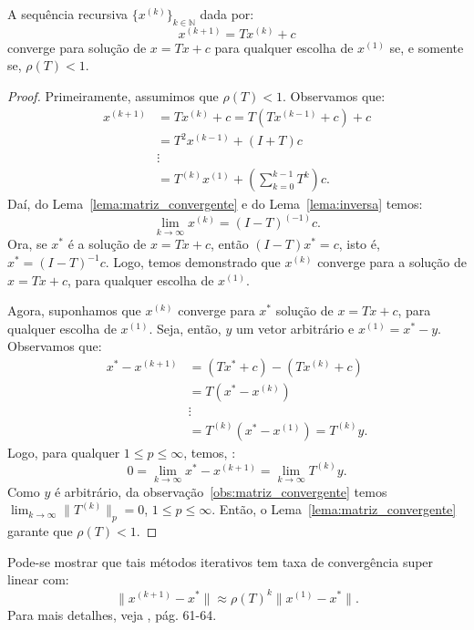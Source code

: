\begin{teo}\label{teo:convergencia}
  A sequência recursiva $\{x^{(k)}\}_{k\in\mathbb{N}}$ dada por:
  \begin{equation*}
    x^{(k+1)} = Tx^{(k)} + c
  \end{equation*}
converge para solução de $x = Tx + c$ para qualquer escolha de $x^{(1)}$ se, e somente se, $\rho(T) < 1$.
\end{teo}
\begin{proof}
  Primeiramente, assumimos que $\rho(T) < 1$. Observamos que:
  \begin{eqnarray*}
    x^{(k+1)} &= Tx^{(k)} + c = T(Tx^{(k-1)} + c) + c \\
    &= T^2x^{(k-1)} + (I + T)c \\
    &\vdots\\
    &= T^{(k)}x^{(1)} + \left(\sum_{k=0}^{k-1}T^k\right)c.
  \end{eqnarray*}
Daí, do Lema~\ref{lema:matriz_convergente} e do Lema~\ref{lema:inversa} temos:
\begin{equation*}
  \lim_{k\to\infty} x^{(k)} = (I - T)^{(-1)}c.
\end{equation*}
Ora, se $x^*$ é a solução de $x = Tx + c$, então $(I - T)x^* = c$, isto é, $x^* = (I - T)^{-1}c$. Logo, temos demonstrado que $x^{(k)}$ converge para a solução de  $x = Tx + c$, para qualquer escolha de $x^{(1)}$.

Agora, suponhamos que $x^{(k)}$ converge para $x^*$ solução de $x = Tx + c$, para qualquer escolha de $x^{(1)}$. Seja, então, $y$ um vetor arbitrário e $x^{(1)} = x^* - y$. Observamos que:
\begin{eqnarray*}
  x^* - x^{(k+1)} &= (Tx^* + c) - (Tx^{(k)} + c) \\
  &= T(x^* - x^{(k)})\\
  &\vdots\\
  &= T^{(k)}(x^* - x^{(1)}) = T^{(k)}y.
\end{eqnarray*}
Logo, para qualquer $1 \leq p \leq\infty$, temos, :
\begin{equation*}
  0 = \lim_{k\to\infty} x^* - x^{(k+1)} = \lim_{k\to\infty} T^{(k)}y.
\end{equation*}
Como $y$ é arbitrário, da observação~\ref{obs:matriz_convergente} temos $\displaystyle\lim_{k\to\infty} \|T^{(k)}\|_p = 0$, $1 \leq p \leq \infty$. Então, o Lema~\ref{lema:matriz_convergente} garante que $\rho(T) < 1$.
\end{proof}

\begin{obs}
  Pode-se mostrar que tais métodos iterativos tem taxa de convergência super linear com:
  \begin{equation*}
    \|x^{(k+1)} - x^*\| \approx \rho(T)^{k}\|x^{(1)} - x^*\|.
  \end{equation*}
Para mais detalhes, veja \cite{Isaacson1994a}, pág. 61-64.
\end{obs}

